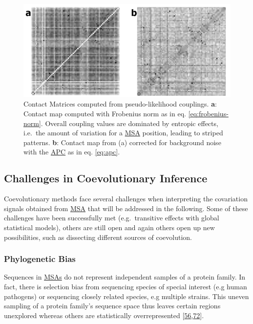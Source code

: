 \documentclass[12pt,a4paper,twoside]{book}
\theoremstyle{definition}
\theoremstyle{definition}
\theoremstyle{remark}
\begin{document}
\begin{figure}
\includegraphics[width=1\linewidth]{img/intro/apc_correction_transparent} \caption{Contact Matrices computed from
pseudo-likelihood couplings. \textbf{a}: Contact map computed with
Frobenius norm as in eq. \eqref{eq:frobenius-norm}. Overall coupling
values are dominated by entropic effects, i.e.~the amount of variation
for a \protect\hyperlink{abbrev}{MSA} position, leading to striped
patterns. \textbf{b}: Contact map from (a) corrected for background
noise with the \protect\hyperlink{abbrev}{APC} as in eq. \eqref{eq:apc}.}\label{fig:apc-correction}
\end{figure}

\subsection{Challenges in Coevolutionary Inference}\label{challenges}

Coevolutionary methods face several challenges when interpreting the
covariation signals obtained from \protect\hyperlink{abbrev}{MSA} that
will be addressed in the following. Some of these challenges have been
successfully met (e.g.~transitive effects with global statistical
models), others are still open and again others open up new
possibilities, such as dissecting different sources of coevolution.

\subsubsection*{Phylogenetic Bias}\label{phylogenetic-bias}

Sequences in \protect\hyperlink{abbrev}{MSAs} do not represent
independent samples of a protein family. In fact, there is selection
bias from sequencing species of special interest (e.g human pathogens)
or sequencing closely related species, e.g multiple strains. This uneven
sampling of a protein family's sequence space thus leaves certain
regions unexplored whereas others are statistically overrepresented
{[}\protect\hyperlink{ref-Morcos2011}{56},\protect\hyperlink{ref-Marks2012}{72}{]}.
\end{document}

